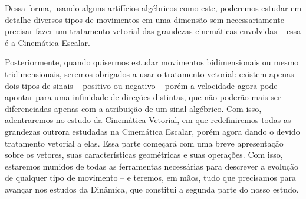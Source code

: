Dessa forma, usando alguns artifícios algébricos como este, poderemos estudar em detalhe diversos tipos de movimentos em uma dimensão sem necessariamente precisar fazer um tratamento vetorial das grandezas cinemáticas envolvidas -- essa é a Cinemática Escalar.

Posteriormente, quando quisermos estudar movimentos bidimensionais ou mesmo tridimensionais, seremos obrigados a usar o tratamento vetorial: existem apenas dois tipos de sinais -- positivo ou negativo -- porém a velocidade agora pode apontar para uma infinidade de direções distintas, que não poderão mais ser diferenciadas apenas com a atribuição de um sinal algébrico. Com isso, adentraremos no estudo da Cinemática Vetorial, em que redefiniremos todas as grandezas outrora estudadas na Cinemática Escalar, porém agora dando o devido tratamento vetorial a elas. Essa parte começará com uma breve apresentação sobre os vetores, suas características geométricas e suas operações. Com isso, estaremos munidos de todas as ferramentas necessárias para descrever a evolução de qualquer tipo de movimento -- e teremos, em mãos, tudo que precisamos para avançar nos estudos da Dinâmica, que constitui a segunda parte do nosso estudo.







